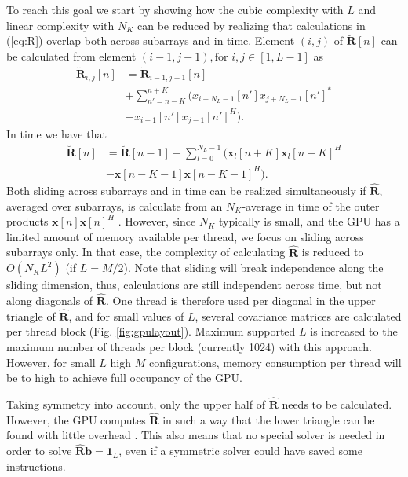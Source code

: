 \documentclass[journal]{IEEEtran}
\newcommand{\mat}[1]{\mathbf{#1}}
\renewcommand{\vec}[1]{\mathbf{#1}}
\begin{document}
To reach this goal we start by showing how the cubic complexity with $L$ and linear complexity with $N_K$ can be reduced by realizing that calculations in (\ref{eq:R}) overlap both across subarrays and in time. Element $(i,j)$ of $\mat{\breve{R}}[n]$ can be calculated from element $(i-1, j-1), \text{for } i,j \in [1, L-1]$ as
\begin{align}
\mat{\breve{R}}_{i,j}[n] &=  \mat{\breve{R}}_{i-1,j-1}[n]  \nonumber \\
&+ \sum_{n'=n-K}^{n+K} (x_{i+N_L-1}[n']x_{j+N_L-1}[n']^* \nonumber \\
&- x_{i-1}[n']x_{j-1}[n']^H). \label{eq:sliding}
\end{align}
In time we have that
\begin{align}
\mat{\breve{R}}[n] &= \mat{\breve{R}}[n-1] + \sum_{l=0}^{N_L-1} (\vec{x}_l[n+K]\vec{x}_l[n+K]^H \nonumber \\
&- \vec{x}[n-K-1]\vec{x}[n-K-1]^H).
\end{align}
Both sliding across subarrays and in time can be realized simultaneously if $\mat{\hat{R}}$, averaged over subarrays, is calculate from an $N_K$-average in time of the outer products $\vec{x}[n]\vec{x}[n]^H$ \cite{Buskenes}. However, since $N_K$ typically is small, and the GPU has a limited amount of memory available per thread, we focus on sliding across subarrays only. In that case, the complexity of calculating $\mat{\hat{R}}$ is reduced to $O(N_KL^2)$ (if $L=M/2$). Note that sliding will break independence along the sliding dimension, thus, calculations are still independent across time, but not along diagonals of $\mat{\hat{R}}$. One thread is therefore used per diagonal in the upper triangle of $\mat{\hat{R}}$, and for small values of $L$, several covariance matrices are calculated per thread block (Fig. \ref{fig:gpulayout}). Maximum supported $L$ is increased to the maximum number of threads per block (currently 1024) with this approach. However, for small $L$ high $M$ configurations, memory consumption per thread will be to high to achieve full occupancy of the GPU.

Taking symmetry into account, only the upper half of $\mat{\hat{R}}$ needs to be calculated. However, the GPU computes $\mat{\hat{R}}$ in such a way that the lower triangle can be found with little overhead \cite{Buskenes}. This also means that no special solver is needed in order to solve $\mat{\hat{R}}\vec{b} = \vec{1}_L$, even if a symmetric solver could have saved some instructions.
\end{document}
